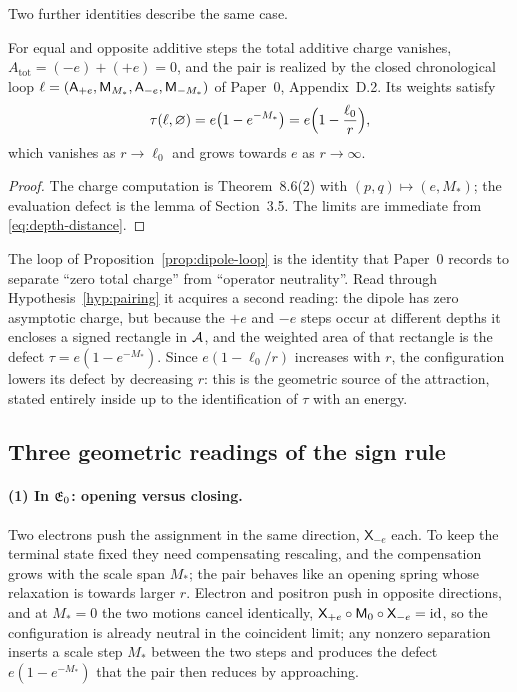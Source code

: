 Two further \AEG{} identities describe the same case.

\begin{proposition}
\label{prop:dipole-loop}
For equal and opposite additive steps the total additive charge vanishes,
$A_{\mathrm{tot}}=(-e)+(+e)=0$, and the pair is realized by the closed
chronological loop
$\ell=(\mathsf A_{+e},\mathsf M_{M_*},\mathsf A_{-e},\mathsf M_{-M_*})$ of Paper~0, Appendix~D.2.  Its
weights satisfy
\[
  \tau(\ell,\varnothing)=e\bigl(1-e^{-M_*}\bigr)=e\Bigl(1-\frac{\ell_0}{r}\Bigr),
\]
which vanishes as $r\to\ell_0$ and grows towards $e$ as $r\to\infty$.
\end{proposition}

\begin{proof}
The charge computation is Theorem~8.6(2) with $(p,q)\mapsto(e,M_*)$; the
evaluation defect is the lemma of Section~3.5.  The limits are immediate from
\eqref{eq:depth-distance}.
\end{proof}

\begin{remark}
\label{rem:dipole}
The loop of Proposition~\ref{prop:dipole-loop} is the identity that Paper~0
records to separate ``zero total charge'' from ``operator neutrality''.  Read
through Hypothesis~\ref{hyp:pairing} it acquires a second reading: the dipole
has zero asymptotic charge, but because the $+e$ and $-e$ steps occur at
different depths it encloses a signed rectangle in $\mathcal{A}$, and the weighted area
of that rectangle is the defect $\tau=e(1-e^{-M_*})$.  Since
$e(1-\ell_0/r)$ increases with $r$, the configuration lowers its defect by
decreasing $r$: this is the geometric source of the attraction, stated entirely
inside \AEG{} up to the identification of $\tau$ with an energy.
\end{remark}

\subsection{Three geometric readings of the sign rule}
\label{subsec:three-readings}

\paragraph{(1) In $\mathfrak{E}_0$: opening versus closing.}
Two electrons push the assignment in the same direction, $\mathsf X_{-e}$ each.
To keep the terminal state fixed they need compensating rescaling, and the
compensation grows with the scale span $M_*$; the pair behaves like an opening
spring whose relaxation is towards larger $r$.  Electron and positron push in
opposite directions, and at $M_*=0$ the two motions cancel identically,
$\mathsf X_{+e}\circ\mathsf M_0\circ\mathsf X_{-e}=\operatorname{id}$, so the configuration is
already neutral in the coincident limit; any nonzero separation inserts a scale
step $M_*$ between the two steps and produces the defect
$e(1-e^{-M_*})$ that the pair then reduces by approaching.

